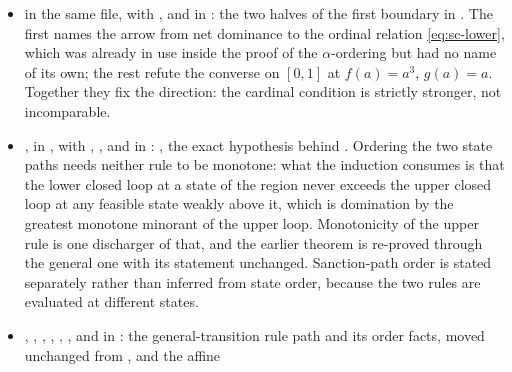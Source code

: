 \begin{itemize}[leftmargin=1.4em,itemsep=1pt]
declaration is the equivalence with the strictly-falling total gap, which is
what makes the condition an accounting restatement rather than a new assumption;
the fourth is the strictly stronger channel-by-channel route, recorded as a
corollary so the direction of the implication is visible.
\item {} in the same file, with
,
 and
 in
: the two halves of
the first boundary in .  The first names the arrow from
net dominance to the ordinal relation \eqref{eq:sc-lower}, which was already in
use inside the proof of the $\alpha$-ordering but had no name of its own; the
rest refute the converse on $[0,1]$ at $f(a)=a^{3}$, $g(a)=a$.  Together they
fix the direction: the cardinal condition is strictly stronger, not
incomparable.
\item {},
 in
, with
,
,
 and
 in
:
, the exact
hypothesis behind .  Ordering the two state paths
needs neither rule to be monotone: what the induction consumes is that the lower
closed loop at a state of the region never exceeds the upper closed loop at any
feasible state weakly above it, which is domination by the greatest monotone
minorant of the upper loop.  Monotonicity of the upper rule is one discharger of
that, and the earlier theorem is re-proved through the general one with its
statement unchanged.  Sanction-path order is stated separately rather than
inferred from state order, because the two rules are evaluated at different
states.
\item {}, , ,
, ,
,
 and  in
: the general-transition rule
path and its order facts, moved unchanged from
, and the affine

\end{itemize}
